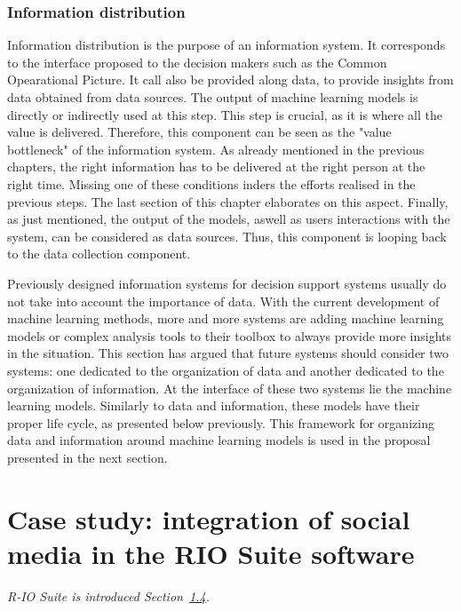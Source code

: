 \subsubsection{Information distribution}
\label{sec:information-distribution}
Information distribution is the purpose of an information system.
It corresponds to the interface proposed to the decision makers such as the Common Opearational Picture.
It call also be provided along data, to provide insights from data obtained from data sources.
The output of machine learning models is directly or indirectly used at this step.
This step is crucial, as it is where all the value is delivered.
Therefore, this component can be seen as the "value bottleneck" of the information system.
As already mentioned in the previous chapters, the right information has to be delivered at the right person at the right time.
Missing one of these conditions inders the efforts realised in the previous steps.
The last section of this chapter elaborates on this aspect.
Finally, as just mentioned, the output of the models, aswell as users interactions with the system, can be considered as data sources.
Thus, this component is looping back to the data collection component.

Previously designed information systems for decision support systems usually do not take into account the importance of data.
With the current development of machine learning methods, more and more systems are
adding machine learning models or complex analysis tools to their toolbox to always provide more insights in the situation.
This section has argued that future systems should consider two systems: one
dedicated to the organization of data and another dedicated to the organization of information.
At the interface of these two systems lie the machine learning models.
Similarly to data and information, these models have their proper life cycle, as presented below previously.
This framework for organizing data and information around machine learning models is used
in the proposal presented in the next section.

\section{Case study: integration of social media in the RIO Suite software}
\textit{R-IO Suite is introduced Section~\hyperref[sec:academic-domains]{1.4}.}

